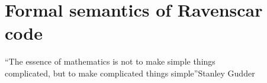 \chapter{Formal semantics of Ravenscar code}{``The essence of
  mathematics is not to make simple things\\complicated, but to make
  complicated things simple''}{Stanley Gudder}
\label{chap:formal_sem}
\newcommand{\MM}[1]{\ensuremath{#1}}

\newcommand{\REGLE}[3]{
    \MM{
      \dfrac{\begin{array}{l} #1 \end{array}}
	    {\begin{array}{l} #2 \end{array}}
    }
    \begin{left}
      \hbox{#3}
    \end{left}
}
                               
\newcommand{\regle}[2]{
  \MM{
    \frac{\begin{array}{c} #1 \end{array}}
         {\begin{array}{l} #2 \end{array}}
  }
}

\newcommand{\formatreg}[1]{
  \begin{center}
    \vspace{0.5mm}
    \fbox{#1}\\
  \end{center}
}

\newcommand{\Fait}[1]{\MM{\ \ \xrightarrow{#1}}}

\newcommand{\fait}[1]{\MM{\xrightarrow{\ \ #1}}}

\newcommand{\Faitv}[1]{\MM{\ \xrightarrow{#1}\ }}

\newcommand{\RL}[1]{\,\frac{}{\,^{{#1}}\,}\,}

\newcommand{\RS}[1]{\,\frac{}{^{{#1}}}\,}

\newcommand{\sqplus}{\ {\scriptstyle {\widehat{+}}}\ }

\newcommand{\smplus}{\ {\scriptstyle {\dot{+}}}\ }

\newcommand{\intrupt}{\,{\scriptstyle\leadsto}\,}

\newcommand{\rget}{\frac{}{\text{\ttfamily\ Get\ }}}

